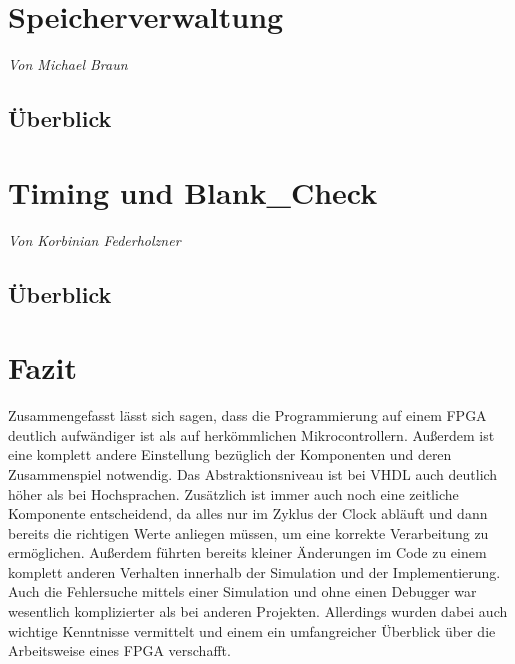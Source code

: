 \documentclass[12pt,a4paper,bibliography=totoc,listof=totoc]{scrartcl}
\begin{document}
\pagebreak
\section{Speicherverwaltung}
\textit{Von Michael Braun}
\subsection{Überblick}


\pagebreak
\section{Timing und Blank\_Check}
\textit{Von Korbinian Federholzner}
\subsection{Überblick}

\subsection{}


\pagebreak
\section{Fazit}

Zusammengefasst lässt sich sagen, dass die Programmierung auf einem 
FPGA deutlich aufwändiger ist als auf herkömmlichen Mikrocontrollern. Außerdem ist eine komplett andere Einstellung bezüglich der 
Komponenten und deren Zusammenspiel notwendig. Das Abstraktionsniveau ist bei VHDL auch deutlich höher als bei Hochsprachen. 
Zusätzlich ist immer auch noch eine zeitliche Komponente entscheidend, da alles nur im Zyklus der Clock abläuft und dann bereits 
die richtigen Werte anliegen müssen, um eine korrekte Verarbeitung zu ermöglichen. Außerdem führten bereits kleiner Änderungen im 
Code zu einem komplett anderen Verhalten innerhalb der Simulation und der Implementierung. Auch die Fehlersuche mittels einer Simulation 
und ohne einen Debugger war wesentlich komplizierter als bei anderen Projekten. Allerdings wurden dabei auch wichtige Kenntnisse 
vermittelt und einem ein umfangreicher Überblick über die Arbeitsweise eines FPGA verschafft.
\end{document}
